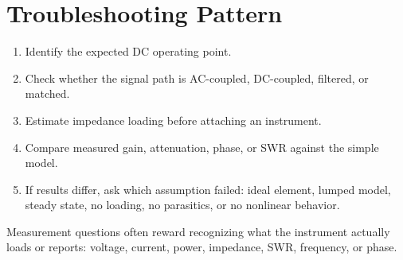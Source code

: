 \section{Troubleshooting Pattern}
\begin{enumerate}
\item Identify the expected DC operating point.
\item Check whether the signal path is AC-coupled, DC-coupled, filtered, or
matched.
\item Estimate impedance loading before attaching an instrument.
\item Compare measured gain, attenuation, phase, or SWR against the simple
model.
\item If results differ, ask which assumption failed: ideal element, lumped
model, steady state, no loading, no parasitics, or no nonlinear behavior.
\end{enumerate}

\begin{exambox}
Measurement questions often reward recognizing what the instrument actually
loads or reports: voltage, current, power, impedance, SWR, frequency, or phase.
\end{exambox}
